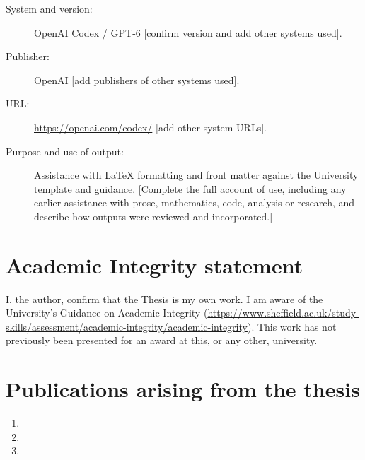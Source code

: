 \begin{description}
\item[System and version:] OpenAI Codex / GPT-6 [confirm version and add other systems used].
\item[Publisher:] OpenAI [add publishers of other systems used].
\item[URL:] \url{https://openai.com/codex/} [add other system URLs].
\item[Purpose and use of output:] Assistance with LaTeX formatting and front matter against the University template and guidance. [Complete the full account of use, including any earlier assistance with prose, mathematics, code, analysis or research, and describe how outputs were reviewed and incorporated.]
\end{description}

\section*{Academic Integrity statement}
I, the author, confirm that the Thesis is my own work. I am aware of the University's Guidance on Academic Integrity (\url{https://www.sheffield.ac.uk/study-skills/assessment/academic-integrity/academic-integrity}). This work has not previously been presented for an award at this, or any other, university.

\section*{Publications arising from the thesis}
\begin{enumerate}
  \item {}
  \item {}
  \item {}
\end{enumerate}
\clearpage
